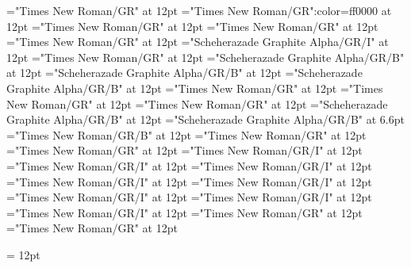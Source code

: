 \documentclass[a4paper]{article}
\begin{document}
\pagestyle{plain}
\sloppy
\setlength{\parfillskip}{0pt plus 1fil}
\font\spanen="Times New Roman/GR" at 12pt
\font\spanur="Times New Roman/GR":color=ff0000 at 12pt
\font\diven="Times New Roman/GR" at 12pt
\font\divur="Times New Roman/GR" at 12pt
\font\xitemxitemdefinitionbefore="Times New Roman/GR" at 12pt
\font\xitemxitemexamplebefore="Scheherazade Graphite Alpha/GR/I" at 12pt
\font\xitemxitemexamplesbefore="Times New Roman/GR" at 12pt
\font\xitemxitemheadwordbefore="Scheherazade Graphite Alpha/GR/B" at 12pt
\font\xitemxitemheadwordminorbefore="Scheherazade Graphite Alpha/GR/B" at 12pt
\font\xitemxitemLexEntrypublishRootMinorPrimaryTargetHeadWordRefbefore="Scheherazade Graphite Alpha/GR/B" at 12pt
\font\xitemxitemlexreftargetsbefore="Times New Roman/GR" at 12pt
\font{}="Times New Roman/GR" at 12pt
\font\entryletDatadicBody="Times New Roman/GR" at 12pt
\font\headwordurentryletDatadicBody="Scheherazade Graphite Alpha/GR/B" at 12pt
\font\xhomographnumberheadwordurentryletDatadicBody="Scheherazade Graphite Alpha/GR/B" at 6.6pt
\font\spanenheadwordurentryletDatadicBody="Times New Roman/GR/B" at 12pt
\font\sensesentryletDatadicBody="Times New Roman/GR" at 12pt
\font\sensesensesentryletDatadicBody="Times New Roman/GR" at 12pt
\font\grammaticalinfosensesensesentryletDatadicBody="Times New Roman/GR/I" at 12pt
\font\partofspeechengrammaticalinfosensesensesentryletDatadicBody="Times New Roman/GR/I" at 12pt
\font\spanenpartofspeechengrammaticalinfosensesensesentryletDatadicBody="Times New Roman/GR/I" at 12pt
\font\slotsgrammaticalinfosensesensesentryletDatadicBody="Times New Roman/GR/I" at 12pt
\font\spanenslotsgrammaticalinfosensesensesentryletDatadicBody="Times New Roman/GR/I" at 12pt
\font\slotnameenslotsgrammaticalinfosensesensesentryletDatadicBody="Times New Roman/GR/I" at 12pt
\font\spanenslotnameenslotsgrammaticalinfosensesensesentryletDatadicBody="Times New Roman/GR/I" at 12pt
\font\spanengrammaticalinfosensesensesentryletDatadicBody="Times New Roman/GR/I" at 12pt
\font{}="Times New Roman/GR" at 12pt
\font\spanendefinitionensensesensesentryletDatadicBody="Times New Roman/GR" at 12pt

\mbox{} 
\newpage 
\newpage 
\setcounter{page}{1} 
\pagestyle{fancy} 
\setlength{\columnsep}{1.5em} 
\setlength\columnseprule{0.4pt} 
\begin{multicols}{2}{\raggedleft} \begin{spacing}{1.5}
\hangindent= 12pt
  \spanenslotsgrammaticalinfosensesensesentryletDatadicBody{: }  \end{spacing}
 \end{multicols}
\end{document}
